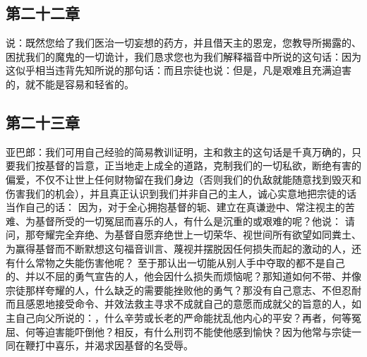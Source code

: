 
\subsection{第二十二章}

\par

说：既然您给了我们医治一切妄想的药方，并且借天主的恩宠，您教导所揭露的、困扰我们的魔鬼的一切诡计，我们恳求您也为我们解释福音中所说的这句话：因为这似乎相当违背先知所说的那句话：而且宗徒也说：但是，凡是艰难且充满迫害的，就不能是容易和轻省的。\par


\subsection{第二十三章}

\par

亚巴郎：我们可用自己经验的简易教训证明，主和救主的这句话是千真万确的，只要我们按基督的旨意，正当地走上成全的道路，克制我们的一切私欲，断绝有害的偏爱，不仅不让世上任何财物留在我们身边（否则我们的仇敌就能随意找到毁灭和伤害我们的机会），并且真正认识到我们并非自己的主人，诚心实意地把宗徒的话当作自己的话： 因为，对于全心拥抱基督的轭、建立在真谦逊中、常注视主的苦难、为基督所受的一切冤屈而喜乐的人，有什么是沉重的或艰难的呢？他说： 请问，那夸耀完全弃绝、为基督自愿弃绝世上一切荣华、视世间所有欲望如同粪土、为赢得基督而不断默想这句福音训言、蔑视并摆脱因任何损失而起的激动的人，还有什么常物之失能伤害他呢？ 至于那认出一切能从别人手中夺取的都不是自己的、并以不屈的勇气宣告的人，他会因什么损失而烦恼呢？那知道如何不带、并像宗徒那样夸耀的人，什么缺乏的需要能挫败他的勇气？那没有自己意志、不但忍耐而且感恩地接受命令、并效法救主寻求不成就自己的意愿而成就父的旨意的人，如主自己向父所说的：，什么辛劳或长老的严命能扰乱他内心的平安？再者，何等冤屈、何等迫害能吓倒他？相反，有什么刑罚不能使他感到愉快？因为他常与宗徒一同在鞭打中喜乐，并渴求因基督的名受辱。\par

